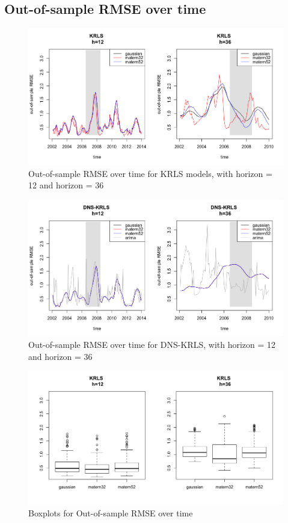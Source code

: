 \newpage

\subsection{Out-of-sample RMSE over time}
\label{sec:graph_rmse}


\begin{figure}[!htb]
\centering
\includegraphics[width=12cm]{gfx/chapter-krls-models/krls_oos_rmse_1}
\caption{Out-of-sample RMSE over time for KRLS models, with horizon = 12 and horizon = 36}
\label{oos_rmse_krls}
\end{figure}

\begin{figure}[!htb]
\centering
\includegraphics[width=12cm]{gfx/chapter-krls-models/krls_oos_rmse_2}
\caption{Out-of-sample RMSE over time for DNS-KRLS, with horizon = 12 and horizon = 36}
\label{oos_rmse_dns_krls}
\end{figure}

\begin{figure}[!htb]
\centering
\includegraphics[width=12cm]{gfx/chapter-krls-models/oos_rmse_dns_krls_1}
\caption{Boxplots for Out-of-sample RMSE over time}
\label{oos_rmse_dns_krls_1}
\end{figure}

